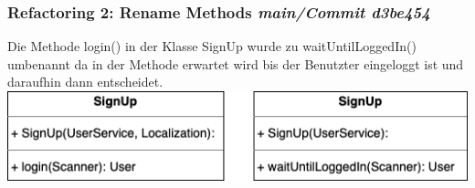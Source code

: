 \subsubsection*{Refactoring 2: Rename Methods \textit{main/Commit d3be454}}
Die Methode login() in der Klasse SignUp wurde zu waitUntilLoggedIn() umbenannt da in der Methode erwartet wird bis der Benutzter eingeloggt ist und daraufhin dann entscheidet.
\newline\newline
\includegraphics[width=\linewidth]{kapitel7_refactoring/Refactor2.png}
 